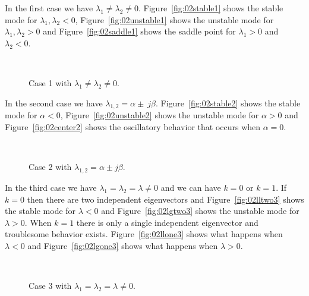 In the first case we have $\lambda_1\neq\lambda_2\neq0$.
Figure~\ref{fig:02stable1} shows the stable mode for $\lambda_1, \lambda_2<0$, Figure~\ref{fig:02unstable1} shows the unstable mode for $\lambda_1, \lambda_2>0$ and Figure~\ref{fig:02saddle1} shows the saddle point for $\lambda_1>0$ and $\lambda_2<0$.

\begin{figure}[ht!]
\centering
{} \hfill
{} \\
\caption{Case 1 with $\lambda_1\neq\lambda_2\neq0$.}%
\label{fig:02case1}
\end{figure}

In the second case we have $\lambda_{1,2}=\alpha\pm\ j\beta$.
Figure~\ref{fig:02stable2} shows the stable mode for $\alpha<0$, Figure~\ref{fig:02unstable2} shows the unstable mode for $\alpha>0$ and Figure~\ref{fig:02center2} shows the oscillatory behavior that occurs when $\alpha=0$.

\begin{figure}[ht!]
\centering
{} \hfill
{} \\
\caption{Case 2 with $\lambda_{1,2} = \alpha\pm j\beta$.}%
\label{fig:02case2}
\end{figure}

In the third case we have $\lambda_1=\lambda_2=\lambda\neq0$ and we can have $k=0$ or $k=1$.
If $k=0$ then there are two independent eigenvectors and Figure~\ref{fig:02lltwo3} shows the stable mode for $\lambda<0$ and Figure~\ref{fig:02lgtwo3} shows the unstable mode for $\lambda>0$.
When $k=1$ there is only a single independent eigenvector and troublesome behavior exists.
Figure~\ref{fig:02llone3} shows what happens when $\lambda<0$ and Figure~\ref{fig:02lgone3} shows what happens when $\lambda>0$.

\begin{figure}[ht!]
\centering
{} \hfill
{} \\
 \hfill
{}
\caption{Case 3 with $\lambda_1=\lambda_2=\lambda\neq0$.}%
\label{fig:02case3}
\end{figure}
